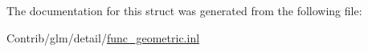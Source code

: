 The documentation for this struct was generated from the following file\+:\begin{DoxyCompactItemize}
\item 
Contrib/glm/detail/\mbox{\hyperlink{func__geometric_8inl}{func\+\_\+geometric.\+inl}}\end{DoxyCompactItemize}

